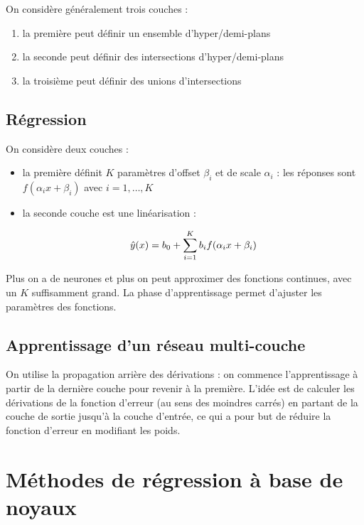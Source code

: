 	On considère généralement trois couches :
	
	\begin{enumerate}
		\item la première peut définir un ensemble d'hyper/demi-plans
		\item la seconde peut définir des intersections d'hyper/demi-plans
		\item la troisième peut définir des unions d'intersections
	\end{enumerate}
	
	
	\subsection{Régression}
	
	On considère deux couches :
	
	\begin{itemize}
		\item la première définit $K$ paramètres d'offset $\beta_i$ et de scale $\alpha_i$ : les réponses sont $f(\alpha_i x + \beta_i)$ avec $i = 1, \dots , K$
		\item la seconde couche est une linéarisation :
		
		$$\hat{y}(x) = b_0 + \sum_{i = 1}^K b_i f(\alpha_i x + \beta_i)$$
	\end{itemize}
	
	
	Plus on a de neurones et plus on peut approximer des fonctions continues, avec un $K$ suffisamment grand. La phase d'apprentissage permet d'ajuster les paramètres des fonctions.
	
	\subsection{Apprentissage d'un réseau multi-couche}
	
	On utilise la propagation arrière des dérivations : on commence l'apprentissage à partir de la dernière couche pour revenir à la première. L'idée est de calculer les dérivations de la fonction d'erreur (au sens des moindres carrés) en partant de la couche de sortie jusqu'à la couche d'entrée, ce qui a pour but de réduire la fonction d'erreur en modifiant les poids.
	
	
\section{Méthodes de régression à base de noyaux}
	
